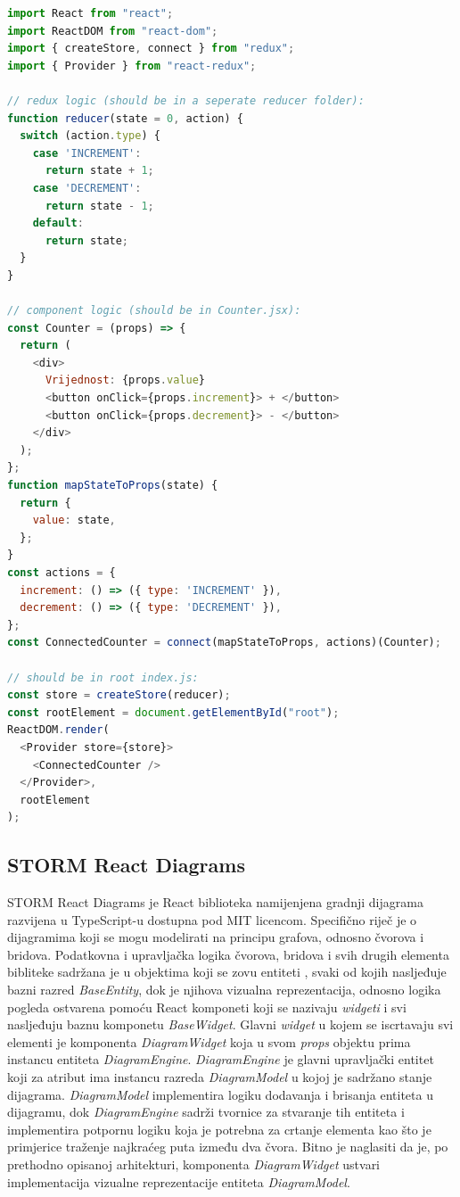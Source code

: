\documentclass[times, utf8, diplomski, numeric]{fer}
\newcommand{\razmakp}{\vspace{18pt}}
\newcommand{\razmaks}{\vspace{10pt}}
\begin{document}
\razmakp %
\begin{lstlisting}[language=JavaScript, caption={Primjer korištenja Redux biblioteke u React aplikaciji}, label={lst:redux}]
import React from "react";
import ReactDOM from "react-dom";
import { createStore, connect } from "redux";
import { Provider } from "react-redux";

// redux logic (should be in a seperate reducer folder):
function reducer(state = 0, action) {
  switch (action.type) {
    case 'INCREMENT':
      return state + 1;
    case 'DECREMENT':
      return state - 1;
    default:
      return state;
  }
}

// component logic (should be in Counter.jsx):
const Counter = (props) => {
  return (
    <div>
      Vrijednost: {props.value}
      <button onClick={props.increment}> + </button>
      <button onClick={props.decrement}> - </button>
    </div>
  );
};
function mapStateToProps(state) {
  return {
    value: state,
  };
}
const actions = {
  increment: () => ({ type: 'INCREMENT' }),
  decrement: () => ({ type: 'DECREMENT' }),
};
const ConnectedCounter = connect(mapStateToProps, actions)(Counter);

// should be in root index.js:
const store = createStore(reducer);
const rootElement = document.getElementById("root");
ReactDOM.render(
  <Provider store={store}>
    <ConnectedCounter />
  </Provider>,
  rootElement
);
\end{lstlisting}
\razmaks


\razmaks
\subsection{STORM React Diagrams} \label{sec:storm}

STORM React Diagrams je React biblioteka namijenjena gradnji dijagrama razvijena u TypeScript-u dostupna pod MIT licencom.
Specifično riječ je o dijagramima koji se mogu modelirati na principu grafova, odnosno čvorova i bridova.
Podatkovna i upravljačka logika čvorova, bridova i svih drugih elementa bibliteke sadržana je u objektima koji se zovu entiteti , svaki od kojih nasljeđuje bazni razred \emph{BaseEntity}, dok je njihova vizualna reprezentacija, odnosno logika pogleda  ostvarena pomoću React komponeti koji se nazivaju \emph{widgeti} i svi nasljeđuju baznu komponetu \emph{BaseWidget}.
Glavni \emph{widget} u kojem se iscrtavaju svi elementi je komponenta \emph{DiagramWidget} koja u svom \emph{props} objektu prima instancu entiteta \emph{DiagramEngine}.
\emph{DiagramEngine} je glavni upravljački entitet koji za atribut ima instancu razreda \emph{DiagramModel} u kojoj je sadržano stanje dijagrama.
\emph{DiagramModel} implementira logiku dodavanja i brisanja entiteta u dijagramu, dok \emph{DiagramEngine} sadrži tvornice  za stvaranje tih entiteta i implementira potpornu logiku koja je potrebna za crtanje elementa kao što je primjerice traženje najkraćeg puta između dva čvora.
Bitno je naglasiti da je, po prethodno opisanoj arhitekturi, komponenta \emph{DiagramWidget} ustvari implementacija vizualne reprezentacije entiteta \emph{DiagramModel}.
\end{document}

